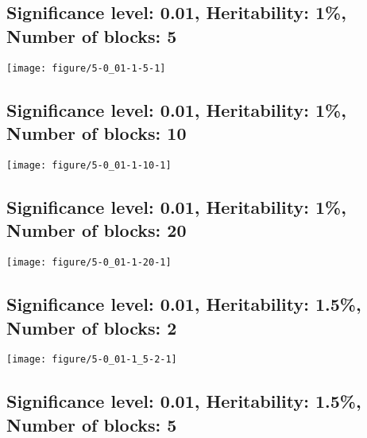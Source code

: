 \documentclass[11pt,letter]{article}\usepackage[]{graphicx}\usepackage[]{color}
\makeatletter
\def\maxwidth{ %
  \ifdim\Gin@nat@width>\linewidth
    \linewidth
  \else
    \Gin@nat@width
  \fi
}
\newenvironment{knitrout}{}{} %
\makeatother
\begin{document}
\newpage
\subsection{Significance level: 0.01, Heritability: 1\%, Number of blocks: 5}

\begin{knitrout}
\color{fgcolor}
\texttt{[image: figure/5-0\_01-1-5-1]} 

\end{knitrout}

\newpage
\subsection{Significance level: 0.01, Heritability: 1\%, Number of blocks: 10}

\begin{knitrout}
\color{fgcolor}
\texttt{[image: figure/5-0\_01-1-10-1]} 

\end{knitrout}

\newpage
\subsection{Significance level: 0.01, Heritability: 1\%, Number of blocks: 20}

\begin{knitrout}
\color{fgcolor}
\texttt{[image: figure/5-0\_01-1-20-1]} 

\end{knitrout}

\newpage
\subsection{Significance level: 0.01, Heritability: 1.5\%, Number of blocks: 2}

\begin{knitrout}
\color{fgcolor}
\texttt{[image: figure/5-0\_01-1\_5-2-1]} 

\end{knitrout}

\newpage
\subsection{Significance level: 0.01, Heritability: 1.5\%, Number of blocks: 5}
\end{document}
